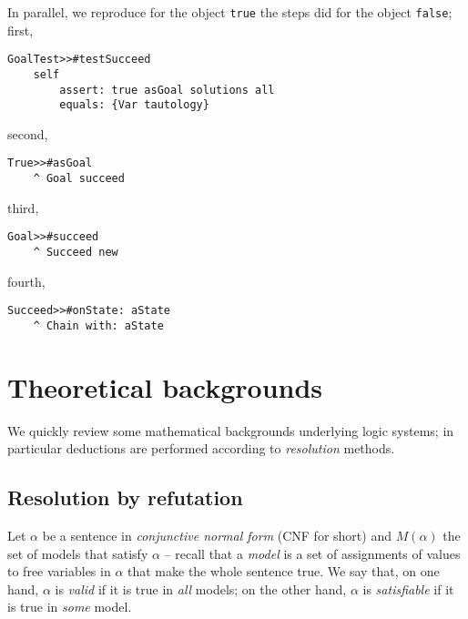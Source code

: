 \documentclass[a4paper,11pt]{article}
\begin{document}
In parallel, we reproduce for the object \Verb|true| the steps did for
the object \Verb|false|; first,
\begin{verbatim}
GoalTest>>#testSucceed
    self
        assert: true asGoal solutions all
        equals: {Var tautology}
\end{verbatim}
second,
\begin{verbatim}
True>>#asGoal
    ^ Goal succeed
\end{verbatim}
third,
\begin{verbatim}
Goal>>#succeed
    ^ Succeed new
\end{verbatim}
fourth,
\begin{verbatim}
Succeed>>#onState: aState
    ^ Chain with: aState
\end{verbatim}

\section{Theoretical backgrounds}

We quickly review some mathematical backgrounds underlying logic systems;
in particular deductions are performed according to \emph{resolution} methods.

\subsection{Resolution by refutation}

Let $\alpha$ be a sentence in \emph{conjunctive normal
form} (CNF for short) and $M(\alpha)$ the set of models that satisfy $\alpha$
-- recall that a \emph{model} is a set of assignments of values to free
variables in $\alpha$ that make the whole sentence true.  We say that, on one
hand, $\alpha$ is \textit{valid} if it is true in \textit{all} models; on the
other hand, $\alpha$ is \textit{satisfiable} if it is true in \textit{some}
model.
\end{document}
